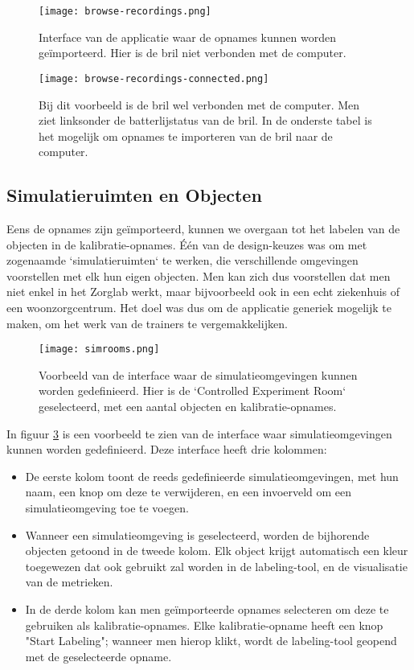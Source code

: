 \begin{figure}[H]
  \centering
  \texttt{[image: browse-recordings.png]}
  \caption[]{\label{fig:browse-recordings} Interface van de applicatie waar de opnames kunnen worden geïmporteerd. Hier is de bril niet verbonden met de computer. }
\end{figure}

\begin{figure}[H]
  \centering
  \texttt{[image: browse-recordings-connected.png]}
  \caption[]{\label{fig:browse-recordings-connected} Bij dit voorbeeld is de bril wel verbonden met de computer. Men ziet linksonder de batterlijstatus van de bril. In de onderste tabel is het mogelijk om opnames te importeren van de bril naar de computer. }
\end{figure}

\subsection{Simulatieruimten en Objecten}

Eens de opnames zijn geïmporteerd, kunnen we overgaan tot het labelen van de objecten in de kalibratie-opnames. Één van de design-keuzes was om met zogenaamde `simulatieruimten` te werken, die verschillende omgevingen voorstellen met elk hun eigen objecten.
Men kan zich dus voorstellen dat men niet enkel in het Zorglab werkt, maar bijvoorbeeld ook in een echt ziekenhuis of een woonzorgcentrum. Het doel was dus om de applicatie generiek mogelijk te maken, om het werk van de trainers te vergemakkelijken.

\begin{figure}[H]
  \centering
  \texttt{[image: simrooms.png]}
  \caption[]{\label{fig:simrooms} Voorbeeld van de interface waar de simulatieomgevingen kunnen worden gedefinieerd. Hier is de `Controlled Experiment Room` geselecteerd, met een aantal objecten en kalibratie-opnames. }
\end{figure}

In figuur \ref{fig:simrooms} is een voorbeeld te zien van de interface waar simulatieomgevingen kunnen worden gedefinieerd. 
Deze interface heeft drie kolommen:
\begin{itemize}
    \item De eerste kolom toont de reeds gedefinieerde simulatieomgevingen, met hun naam, een knop om deze te verwijderen, en een invoerveld om een simulatieomgeving toe te voegen.
    \item Wanneer een simulatieomgeving is geselecteerd, worden de bijhorende objecten getoond in de tweede kolom. Elk object krijgt automatisch een kleur toegewezen dat ook gebruikt zal worden in de labeling-tool, en de visualisatie van de metrieken.
    \item In de derde kolom kan men geïmporteerde opnames selecteren om deze te gebruiken als kalibratie-opnames. Elke kalibratie-opname heeft een knop "Start Labeling"; wanneer men hierop klikt, wordt de labeling-tool geopend met de geselecteerde opname.
\end{itemize}

